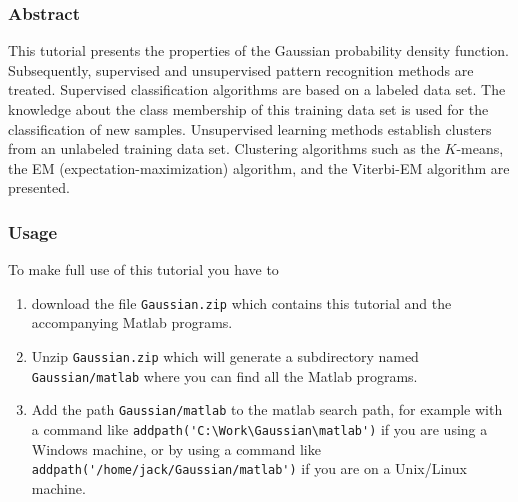 \documentclass[a4paper]{article}
\begin{document}

\author{\small Barbara Resch (minor changes by Erhard Rank)\\
Signal Processing and Speech Communication Laboratory\\
Inffeldgasse 16c/II\\
phone 873--4436}
\date{}



\subsubsection*{Abstract}
This tutorial presents the properties of the Gaussian probability
density function. Subsequently, supervised and unsupervised pattern
recognition methods are treated. Supervised classification algorithms
are based on a labeled data set. The knowledge about the class
membership of this training data set is used for the classification of
new samples. Unsupervised learning methods establish clusters from an
unlabeled training data set.  Clustering algorithms such as the
$K$-means, the EM (expectation-maximization) algorithm, and the
Viterbi-EM algorithm are presented.

\subsubsection*{Usage} To make full use of this tutorial you have to
\begin{enumerate}
  
\item download the file
  {\texttt{Gaussian.zip}} which contains this tutorial  and the accompanying Matlab
  programs.

\item Unzip \texttt{Gaussian.zip} which will generate a
  subdirectory named \texttt{Gaussian/matlab} where you can find
  all the Matlab programs.
  
\item Add the path \texttt{Gaussian/matlab} to the matlab search path,
  for example with a command like
  \verb#addpath('C:\Work\Gaussian\matlab')# if you are using a Windows
  machine, or by using a command like
  \verb#addpath('/home/jack/Gaussian/matlab')# if you are on a
  Unix/Linux machine.

\end{enumerate}
\end{document}
